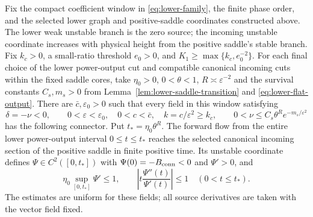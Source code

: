 \begin{proposition}
\label{prop:complete-signed-connector}
Fix the compact coefficient window in \eqref{eq:lower-family}, the finite
phase order, and the selected lower graph and positive-saddle coordinates
constructed above. The lower weak unstable branch is the zero source;
the incoming unstable coordinate increases with physical height from
the positive saddle's stable branch. Fix $k_c>0$, a small-ratio threshold
$e_0>0$, and $K_1\ge\max\{k_c,e_0^{-2}\}$.
For each final choice of the lower power-output cut and compatible
canonical incoming cuts within the fixed saddle cores, take
$\eta_0>0$, $0<\theta<1$, $R\asymp\varepsilon^{-2}$ and the survival
constants $C_s,m_s>0$ from Lemma~\ref{lem:lower-saddle-transition} and
\eqref{eq:lower-flat-output}. There are $\bar c,\varepsilon_0>0$ such
that every field in this window satisfying
\[
 \delta=-\nu<0,\qquad
 0<\varepsilon<\varepsilon_0,\quad 0<c<\bar c,\quad
 k=c/\varepsilon^2\ge k_c,\qquad
 0<\nu\le C_s\theta^R e^{-m_s/\varepsilon^2}
\]
has the following connector. Put $t_*=\eta_0\theta^R$.
The forward flow from the entire lower power-output interval
$0\le t\le t_*$ reaches the selected canonical incoming section of the
positive saddle in finite positive time. Its unstable coordinate defines
$\Psi\in C^2([0,t_*])$ with
$\Psi(0)=-B_{\rm conn}<0$ and $\Psi'>0$, and
\begin{equation}\label{eq:lower-connector-C2}
 \eta_0\sup_{[0,t_*]}\Psi'\le1,\qquad
 \left|t\frac{\Psi''(t)}{\Psi'(t)}\right|\le1
 \quad(0<t\le t_*).
\end{equation}
The estimates are uniform for these fields; all source derivatives are
taken with the vector field fixed.
\end{proposition}

